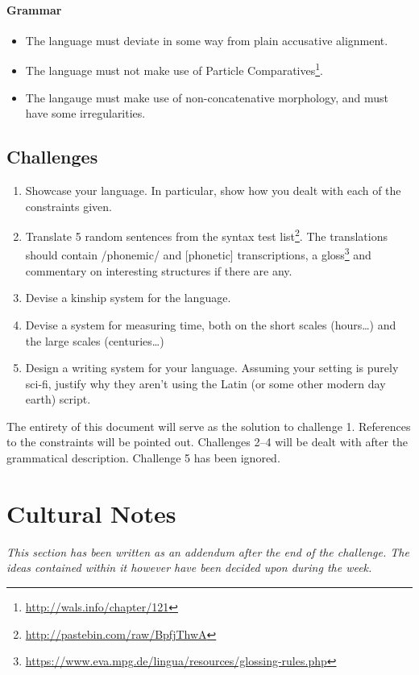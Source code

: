 \documentclass{article}
\begin{document}
\paragraph{Grammar}
\begin{itemize}
\item The language must deviate in some way from plain accusative alignment. 
\item The language must not make use of Particle Comparatives\footnote{\url{http://wals.info/chapter/121}}. 
\item The langauge must make use of non-concatenative morphology, and must have some irregularities.
\end{itemize}

\subsection{Challenges}
\begin{enumerate}
\item Showcase your language. In particular, show how you dealt with each of the constraints given.
\item Translate 5 random sentences from the syntax test list\footnote{\url{http://pastebin.com/raw/BpfjThwA}}. The translations should contain /phonemic/ and [phonetic] transcriptions, a gloss\footnote{\url{https://www.eva.mpg.de/lingua/resources/glossing-rules.php}} and commentary on interesting structures if there are any. 
\item Devise a kinship system for the language.
\item Devise a system for measuring time, both on the short scales (hours…) and the large scales (centuries…) 
\item Design a writing system for your language. Assuming your setting is purely sci-fi, justify why they aren’t using the Latin (or some other modern day earth) script. 
\end{enumerate}

The entirety of this document will serve as the solution to challenge 1. References to the constraints will be pointed out. Challenges 2–4 will be dealt with after the grammatical description. Challenge 5 has been ignored.

\newpage
\section{Cultural Notes}
\emph{This section has been written as an addendum after the end of the challenge. The ideas contained within it however have been decided upon during the week.}
\end{document}
